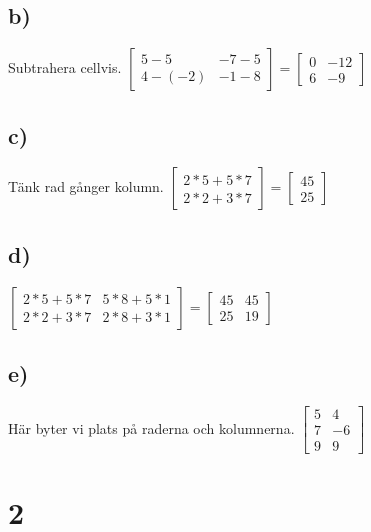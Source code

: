\documentclass{article}
\begin{document}
\subsection*{b)}
Subtrahera cellvis.
$ 
    			\begin{bmatrix}
    			5-5 & -7-5 \\
    			4-(-2) & -1-8
    			\end{bmatrix}
    			=
    			\begin{bmatrix}
    			0 & -12 \\
    			6  & -9
    			\end{bmatrix}
    			$
    			
\subsection*{c)}
Tänk rad gånger kolumn.
$ 
    			\begin{bmatrix}
    			2*5+5*7  \\
    			2*2+3*7
    			\end{bmatrix}
    			=
    			\begin{bmatrix}
    			45  \\
    			25
    			\end{bmatrix}
    			$

\subsection*{d)}

$ 
    			\begin{bmatrix}
    			2*5+5*7 & 5*8+5*1  \\
    			2*2+3*7 & 2*8+3*1
    			\end{bmatrix}
    			=
    			\begin{bmatrix}
    			45 & 45\\
    			25 & 19
    			\end{bmatrix}
    			$

\subsection*{e)}
Här byter vi plats på raderna och kolumnerna.
				$ 
    			\begin{bmatrix}
    			5 & 4 \\
    			7 & -6 \\
    			9 & 9 
    			\end{bmatrix}
    			$
    			
    			
\section*{2}
\end{document}
